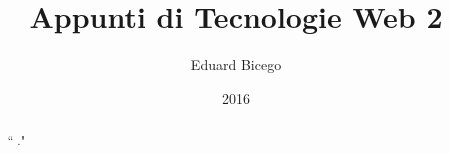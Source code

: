 \documentclass[a4paper,11pt]{article}
\begin{document}
\title{Appunti di Tecnologie Web 2}
\author{Eduard Bicego}
\date{2016}

\maketitle

\begin{abstract}
	`` ."
\end{abstract}

\tableofcontents
	\newpage
\listoffigures








%

%

%

%

%

%

%

%

%


\end{document}
